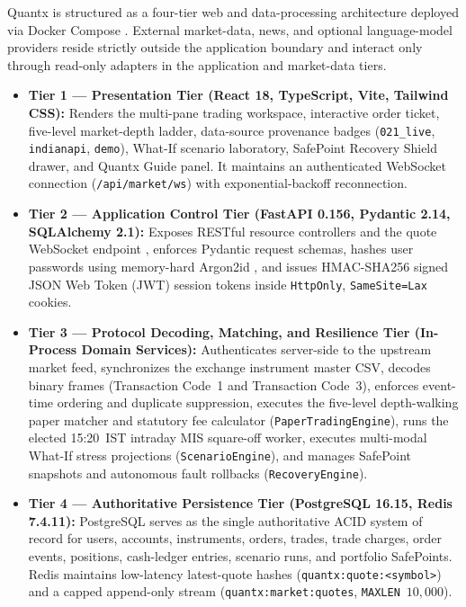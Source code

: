\documentclass[12pt]{article}
\begin{document}
Quantx is structured as a four-tier web and data-processing architecture deployed via Docker Compose \cite{quantx_software}. External market-data, news, and optional language-model providers reside strictly outside the application boundary and interact only through read-only adapters in the application and market-data tiers.
\begin{itemize}
  \item \textbf{Tier 1 --- Presentation Tier (React 18, TypeScript, Vite, Tailwind CSS):} Renders the multi-pane trading workspace, interactive order ticket, five-level market-depth ladder, data-source provenance badges (\texttt{021\_live}, \texttt{indianapi}, \texttt{demo}), What-If scenario laboratory, SafePoint Recovery Shield drawer, and Quantx Guide panel. It maintains an authenticated WebSocket connection (\texttt{/api/market/ws}) with exponential-backoff reconnection.
  \item \textbf{Tier 2 --- Application Control Tier (FastAPI 0.156, Pydantic 2.14, SQLAlchemy 2.1):} Exposes RESTful resource controllers \cite{fielding2000} and the quote WebSocket endpoint \cite{rfc6455}, enforces Pydantic request schemas, hashes user passwords using memory-hard Argon2id \cite{biryukov2016}, and issues HMAC-SHA256 signed JSON Web Token (JWT) session tokens \cite{rfc7519} inside \texttt{HttpOnly}, \texttt{SameSite=Lax} cookies.
  \item \textbf{Tier 3 --- Protocol Decoding, Matching, and Resilience Tier (In-Process Domain Services):} Authenticates server-side to the upstream market feed, synchronizes the exchange instrument master CSV, decodes binary frames (Transaction Code~1 and Transaction Code~3), enforces event-time ordering and duplicate suppression, executes the five-level depth-walking paper matcher and statutory fee calculator (\texttt{PaperTradingEngine}), runs the elected 15:20~IST intraday MIS square-off worker, executes multi-modal What-If stress projections (\texttt{ScenarioEngine}), and manages SafePoint snapshots and autonomous fault rollbacks (\texttt{RecoveryEngine}).
  \item \textbf{Tier 4 --- Authoritative Persistence Tier (PostgreSQL 16.15, Redis 7.4.11):} PostgreSQL serves as the single authoritative ACID system of record for users, accounts, instruments, orders, trades, trade charges, order events, positions, cash-ledger entries, scenario runs, and portfolio SafePoints. Redis maintains low-latency latest-quote hashes (\texttt{quantx:quote:<symbol>}) and a capped append-only stream (\texttt{quantx:market:quotes}, \texttt{MAXLEN}~$10{,}000$).
\end{itemize}
\end{document}

